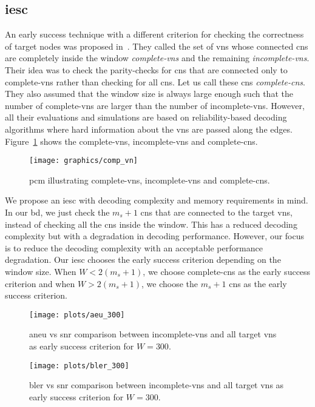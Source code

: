 \subsection{\acl{iesc}}
An early success technique with a different criterion for checking the correctness of target nodes was proposed in~\cite{Kang2018}. They called the set of \acp{vn} whose connected \acp{cn} are completely inside the window \emph{complete-\acp{vn}} and the remaining \emph{incomplete-\acp{vn}}. Their idea was to check the parity-checks for \acp{cn} that are connected only to complete-\acp{vn} rather than checking for all \acp{cn}. Let us call these \acp{cn} \emph{complete-\acp{cn}}. They also assumed that the window size is always large enough such that the number of complete-\acp{vn} are larger than the number of incomplete-\acp{vn}. However, all their evaluations and simulations are based on reliability-based decoding algorithms where hard information about the \acp{vn} are passed along the edges. Figure~\ref{fig:comp_vn} shows the complete-\acp{vn}, incomplete-\acp{vn} and complete-\acp{cn}.
\begin{figure}[htbp]
  \centering
  \texttt{[image: graphics/comp\_vn]}
  \caption{\ac{pcm} illustrating complete-\acp{vn}, incomplete-\acp{vn} and complete-\acp{cn}.}
  \label{fig:comp_vn}
\end{figure}

We propose an \ac{iesc} with decoding complexity and memory requirements in mind. In our \ac{bd}, we just check the $m_s+1$ \acp{cn} that are connected to the target \acp{vn}, instead of checking all the \acp{cn} inside the window. This has a reduced decoding complexity but with a degradation in decoding performance. However, our focus is to reduce the decoding complexity with an acceptable performance degradation. Our \ac{iesc} chooses the early success criterion depending on the window size. When $W<2(m_s+1)$, we choose complete-\acp{cn} as the early success criterion and when $W>2(m_s+1)$, we choose the $m_s+1$ \acp{cn} as the early success criterion.

\begin{figure}[htbp]
  \centering
  \texttt{[image: plots/aeu\_300]}
  \caption{\ac{aneu} vs \ac{snr} comparison between incomplete-\acp{vn} and all target \acp{vn} as early success criterion for $W=300$.}
  \label{fig:aneu_vs_snr_300}
\end{figure}

\begin{figure}[htbp]
  \centering
  \texttt{[image: plots/bler\_300]}
  \caption{\ac{bler} vs \ac{snr} comparison between incomplete-\acp{vn} and all target \acp{vn} as early success criterion for $W=300$.}
  \label{fig:bler_vs_snr_300}
\end{figure}


